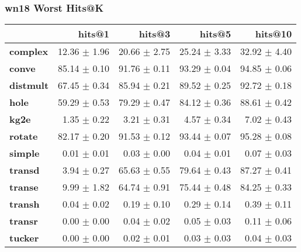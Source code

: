 \documentclass{article}
\begin{document}
\subsubsection{wn18 Worst Hits@K}
    \begin{center}
    \begin{tabular}{lrrrr}
\toprule
{} &        hits@1 &        hits@3 &        hits@5 &       hits@10 \\
\midrule
\textbf{complex } &  12.36 $\pm$ 1.96 &  20.66 $\pm$ 2.75 &  25.24 $\pm$ 3.33 &  32.92 $\pm$ 4.40 \\
\textbf{conve   } &  85.14 $\pm$ 0.10 &  91.76 $\pm$ 0.11 &  93.29 $\pm$ 0.04 &  94.85 $\pm$ 0.06 \\
\textbf{distmult} &  67.45 $\pm$ 0.34 &  85.94 $\pm$ 0.21 &  89.52 $\pm$ 0.25 &  92.72 $\pm$ 0.18 \\
\textbf{hole    } &  59.29 $\pm$ 0.53 &  79.29 $\pm$ 0.47 &  84.12 $\pm$ 0.36 &  88.61 $\pm$ 0.42 \\
\textbf{kg2e    } &   1.35 $\pm$ 0.22 &   3.21 $\pm$ 0.31 &   4.57 $\pm$ 0.34 &   7.02 $\pm$ 0.43 \\
\textbf{rotate  } &  82.17 $\pm$ 0.20 &  91.53 $\pm$ 0.12 &  93.44 $\pm$ 0.07 &  95.28 $\pm$ 0.08 \\
\textbf{simple  } &   0.01 $\pm$ 0.01 &   0.03 $\pm$ 0.00 &   0.04 $\pm$ 0.01 &   0.07 $\pm$ 0.03 \\
\textbf{transd  } &   3.94 $\pm$ 0.27 &  65.63 $\pm$ 0.55 &  79.64 $\pm$ 0.43 &  87.27 $\pm$ 0.41 \\
\textbf{transe  } &   9.99 $\pm$ 1.82 &  64.74 $\pm$ 0.91 &  75.44 $\pm$ 0.48 &  84.25 $\pm$ 0.33 \\
\textbf{transh  } &   0.04 $\pm$ 0.02 &   0.19 $\pm$ 0.10 &   0.29 $\pm$ 0.14 &   0.39 $\pm$ 0.11 \\
\textbf{transr  } &   0.00 $\pm$ 0.00 &   0.04 $\pm$ 0.02 &   0.05 $\pm$ 0.03 &   0.11 $\pm$ 0.06 \\
\textbf{tucker  } &   0.00 $\pm$ 0.00 &   0.02 $\pm$ 0.01 &   0.03 $\pm$ 0.03 &   0.04 $\pm$ 0.03 \\
\bottomrule
\end{tabular}

    \end{center}
\end{document}
